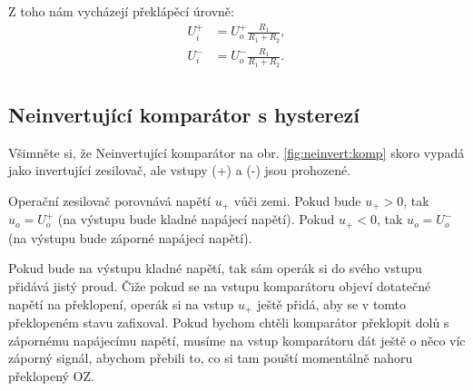 \documentclass[a4paper,12pt]{article}   %
\begin{document}
Z toho nám vycházejí překlápěcí úrovně:\\
\begin{align*}
    U_i^+ &= U_o^+\frac{R_1}{R_1 + R_2},\\
    U_i^- &= U_o^-\frac{R_1}{R_1 + R_2}.\\
\end{align*}





\subsection*{Neinvertující komparátor s hysterezí}
Všimněte si, že Neinvertující komparátor na obr. \ref{fig:neinvert:komp} skoro vypadá jako invertující zesilovač, ale vstupy (+) a (-) jsou prohozené.

Operační zesilovač porovnává napětí $u_+$ vůči zemi. Pokud bude $u_+ > 0$, tak $u_o = U_o^+$ (na výstupu bude kladné napájecí napětí). Pokud $u_+ < 0$, tak $u_o = U_o^-$ (na výstupu bude záporné napájecí napětí).

Pokud bude na výstupu kladné napětí, tak sám operák si do svého vstupu přidává jistý proud. Čiže pokud se na vstupu komparátoru objeví dotatečné napětí na překlopení, operák si na vstup $u_+$ ještě přidá, aby se v tomto překlopeném stavu zafixoval. Pokud bychom chtěli komparátor překlopit dolů s zápornému napájecímu napětí, musíme na vstup komparátoru dát ještě o něco víc záporný signál, abychom přebili to, co si tam pouští momentálně nahoru překlopený OZ.
\end{document}

